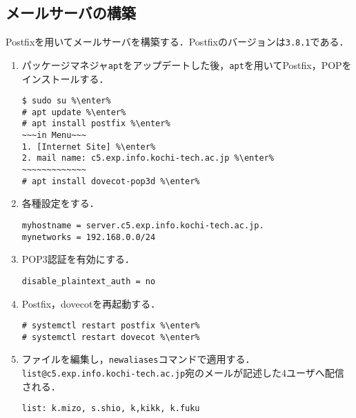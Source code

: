 \subsection{メールサーバの構築}
Postfixを用いてメールサーバを構築する．Postfixのバージョンは\texttt{3.8.1}である．
\begin{enumerate}
    \renewcommand{\labelenumi}{\textbf{\theenumi.}\ }
    \item パッケージマネジャ\texttt{apt}をアップデートした後，\texttt{apt}を用いてPostfix，POPをインストールする．
          \begin{lstlisting}
$ sudo su %\enter%
# apt update %\enter%
# apt install postfix %\enter%
~~~in Menu~~~
1. [Internet Site] %\enter%
2. mail name: c5.exp.info.kochi-tech.ac.jp %\enter%
~~~~~~~~~~~~~
# apt install dovecot-pop3d %\enter%
\end{lstlisting}
    \item 各種設定をする．
          \begin{lstlisting}[style=file,caption={\ttfamily /etc/postfix/main.cf}]
myhostname = server.c5.exp.info.kochi-tech.ac.jp.
mynetworks = 192.168.0.0/24
    \end{lstlisting}
    \item POP3認証を有効にする．
          \begin{lstlisting}[style=file,caption={\ttfamily /etc/dovecot/conf.d/10-auth.conf}]
disable_plaintext_auth = no
\end{lstlisting}
    \item Postfix，dovecotを再起動する．
          \begin{lstlisting}
# systemctl restart postfix %\enter%
# systemctl restart dovecot %\enter%
    \end{lstlisting}
    \item \aliases ファイルを編集し，\texttt{newaliases}コマンドで適用する．\texttt{list@c5.exp.info.kochi-tech.ac.jp}宛のメールが記述した4ユーザへ配信される．
          \begin{lstlisting}[style=file,caption={\ttfamily /etc/aliases}]
list: k.mizo, s.shio, k,kikk, k.fuku
    \end{lstlisting}
\end{enumerate}
\clearpage
